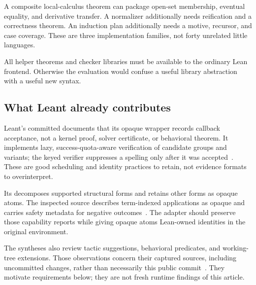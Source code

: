 \documentclass[11pt,a4paper]{article}
\newcommand{\code}[1]{\texttt{\detokenize{#1}}}
\theoremstyle{remark}\newtheorem{example}[proposition]{Example}
\begin{document}
A composite local-calculus theorem can package open-set membership, eventual equality, and derivative transfer. A normalizer additionally needs reification and a correctness theorem. An induction plan additionally needs a motive, recursor, and case coverage. These are three implementation families, not forty unrelated little languages.

All helper theorems and checker libraries must be available to the ordinary Lean frontend. Otherwise the evaluation would confuse a useful library abstraction with a useful new syntax.

\subsection{What Leant already contributes}
Leant's committed  documents that its opaque \code{Verified} wrapper records callback acceptance, not a kernel proof, solver certificate, or behavioral theorem. It implements lazy, success-quota-aware verification of candidate groups and variants; the keyed verifier suppresses a spelling only after it was accepted~\cite{leantverification}. These are good scheduling and identity practices to retain, not evidence formats to overinterpret.

Its  decomposes supported structural forms and retains other forms as opaque atoms. The inspected source describes term-indexed applications as opaque and carries safety metadata for negative outcomes~\cite{leantfragment}. The adapter should preserve those capability reports while giving opaque atoms Lean-owned identities in the original environment.

The syntheses also review tactic suggestions, behavioral predicates, and working-tree extensions. Those observations concern their captured sources, including uncommitted changes, rather than necessarily this public commit~\cite{synthesis,blueprints}. They motivate requirements below; they are not fresh runtime findings of this article.
\end{document}
